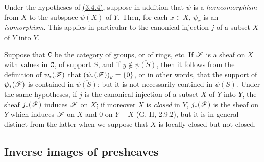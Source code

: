 \begin{env}[3.4.5]
\label{env-0.3.4.5}
Under the hypotheses of \hyperref[env-0.3.4.4]{(3.4.4)}, suppose in addition that $\psi$ is a
{\em homeomorphism} from $X$ to the subspace $\psi(X)$ of $Y$. Then, for each
$x\in X$, $\psi_x$ is an {\em isomorphism}. This applies in particular to the
canonical injection $j$ of a subset $X$ of $Y$ into $Y$.
\end{env}

\begin{env}[3.4.6]
\label{env-0.3.4.6}
Suppose that $\mathtt{C}$ be the category of groups, or of rings, etc. If $\mathscr{F}$ is a
sheaf on $X$ with values in $\mathtt{C}$, of support $S$, and if
$y\not\in\overline{\psi(S)}$, then it follows from the definition of
$\psi_*(\mathscr{F})$ that $(\psi_*(\mathscr{F}))_y=\{0\}$, or in other words, that the
support of $\psi_*(\mathscr{F})$ is contained in $\overline{\psi(S)}$; but it is not
necessarily contined in $\psi(S)$. Under the same hypotheses, if $j$ is the
canonical injection of a subset $X$ of $Y$ into $Y$, the sheaf $j_*(\mathscr{F})$
induces $\mathscr{F}$ on $X$; if moreover $X$ is {\em closed} in $Y$, $j_*(\mathscr{F})$
is the sheaf on $Y$ which induces $\mathscr{F}$ on $X$ and $0$ on $Y-X$
(G, II, 2.9.2), but it is in general distinct from the latter when we suppose
that $X$ is locally closed but not closed.
\end{env}

\subsection{Inverse images of presheaves}
\label{subsection-inverse-images-of-presheaves}

